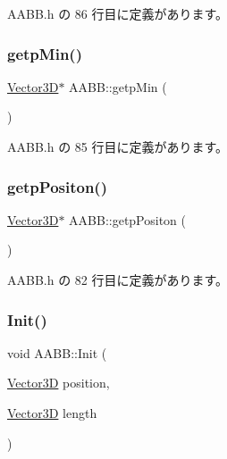  A\+A\+B\+B.\+h の 86 行目に定義があります。

\mbox{\label{class_a_a_b_b_ac73c1bb888074d7004abe68849f67948}} 
\subsubsection{\texorpdfstring{getp\+Min()}{getpMin()}}
{\footnotesize\ttfamily \mbox{\hyperlink{class_vector3_d}{Vector3D}}$\ast$ A\+A\+B\+B\+::getp\+Min (\begin{DoxyParamCaption}{ }\end{DoxyParamCaption})\hspace{0.3cm}{\ttfamily [inline]}}



 A\+A\+B\+B.\+h の 85 行目に定義があります。

\mbox{\label{class_a_a_b_b_a8b8e043a1ccf584416d9899252f97cff}} 
\subsubsection{\texorpdfstring{getp\+Positon()}{getpPositon()}}
{\footnotesize\ttfamily \mbox{\hyperlink{class_vector3_d}{Vector3D}}$\ast$ A\+A\+B\+B\+::getp\+Positon (\begin{DoxyParamCaption}{ }\end{DoxyParamCaption})\hspace{0.3cm}{\ttfamily [inline]}}



 A\+A\+B\+B.\+h の 82 行目に定義があります。

\mbox{\label{class_a_a_b_b_a28167704c3b21de2ae9f70ac139781c4}} 
\subsubsection{\texorpdfstring{Init()}{Init()}}
{\footnotesize\ttfamily void A\+A\+B\+B\+::\+Init (\begin{DoxyParamCaption}\item[{\mbox{\hyperlink{class_vector3_d}{Vector3D}}}]{position,  }\item[{\mbox{\hyperlink{class_vector3_d}{Vector3D}}}]{length }\end{DoxyParamCaption})\hspace{0.3cm}{\ttfamily [inline]}}



